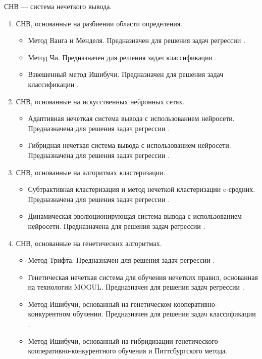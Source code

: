 СНВ --- система нечеткого вывода.
\begin{enumerate}
\item СНВ, основанные на разбиении области определения.
\begin{itemize}
\item Метод Ванга и Менделя. Предназначен для решения задач регрессии \cite{Wang1992}.
\item Метод Чи. Предназначен для решения задач классификации \cite{Chi1996}.
\item Взвешенный метод Ишибучи. Предназначен для решения задач классификации \cite{Ishibuchi2001}.
\end{itemize}
\item СНВ, основанные на искусственных нейронных сетях.
\begin{itemize}
	\item Адаптивная нечеткая система вывода с использованием нейросети. Предназначена для решения задач регрессии \cite{Jan1993}. 
	\item Гибридная нечеткая система вывода с использованием нейросети.  Предназначена для решения задач регрессии \cite{Kim1999}.
\end{itemize}
\item СНВ, основанные на алгоритмах кластеризации.
\begin{itemize}
	\item Субтрактивная кластеризация и метод нечеткой кластеризации c-средних.
	Предназначена для решения задач регрессии \cite{Chiu1996}.
	\item Динамическая эволюционирующая система вывода с использованием нейросети. Предназначена для решения задач регрессии \cite{Kasabov2002}.
\end{itemize}	
\item СНВ, основанные на генетических алгоритмах.
\begin{itemize}
	\item Метод Трифта. Предназначен для решения задач регрессии \cite{Thrift1991}.
	\item Генетическая нечеткая система для обучения нечетких правил, основанная на технологии MOGUL. Предназначен для решения задач регрессии \cite{Cordon1999}.
	\item Метод Ишибучи, основанный на генетическом кооперативно-кон\-курентном обучении. Предназначен для решения задач классификации \cite{Ishibuchi1999}.
	\item Метод Ишибучи, основанный на гибридизации генетического ко\-оперативно-конкурентного обучения и Питтсбургского метода. 

\end{itemize}
\end{enumerate}
